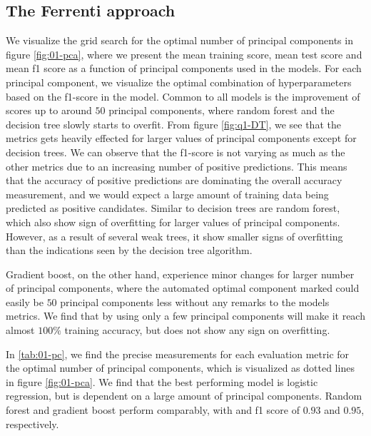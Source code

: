 \subsection{The Ferrenti approach}

We visualize the grid search for the optimal number of principal components in figure \ref{fig:01-pca}, where we present the mean training score, mean test score and mean f1 score as a function of principal components used in the models. For each principal component, we visualize the optimal combination of hyperparameters based on the f1-score in the model. Common to all models is the improvement of scores up to around $50$ principal components, where random forest and the decision tree slowly starts to overfit. From figure \ref{fig:q1-DT}, we see that the metrics gets heavily effected for larger values of principal components except for decision trees. We can observe that the f1-score is not varying as much as the other metrics due to an increasing number of positive predictions. This means that the accuracy of positive predictions are dominating the overall accuracy measurement, and we would expect a large amount of training data being predicted as positive candidates. Similar to decision trees are random forest, which also show sign of overfitting for larger values of principal components. However, as a result of several weak trees, it show smaller signs of overfitting than the indications seen by the decision tree algorithm.

Gradient boost, on the other hand, experience minor changes for larger number of principal components, where the automated optimal component marked could easily be $50$ principal components less without any remarks to the models metrics. We find that by using only a few principal components will make it reach almost $100\%$ training accuracy, but does not show any sign on overfitting.

In \ref{tab:01-pc}, we find the precise measurements for each evaluation metric for the optimal number of principal components, which is visualized as dotted lines in figure \ref{fig:01-pca}. We find that the best performing model is logistic regression, but is dependent on a large amount of principal components. Random forest and gradient boost perform comparably, with and f1 score of $0.93$ and $0.95$, respectively.  %



